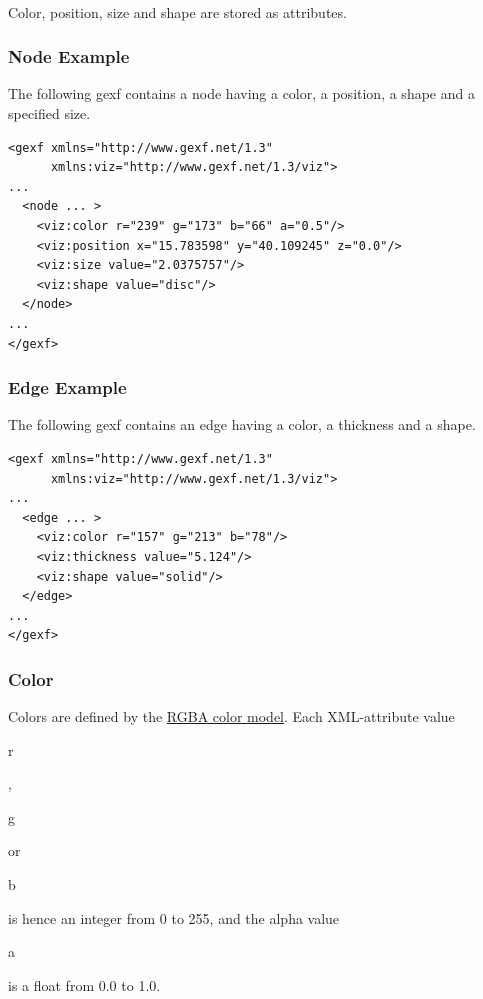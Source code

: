 \documentclass[a4paper,10pt]{article}
\begin{document}
\paragraph{}
Color, position, size and shape are stored as attributes.

\subsubsection{Node Example}

The following gexf contains a node having a color, a position, a shape and a specified size.

\lstset{ style=gexf }
\begin{lstlisting}[caption={VIZ Attributes},label=vizattr]
<gexf xmlns="http://www.gexf.net/1.3"
      xmlns:viz="http://www.gexf.net/1.3/viz">
...
  <node ... >
    <viz:color r="239" g="173" b="66" a="0.5"/>
    <viz:position x="15.783598" y="40.109245" z="0.0"/>
    <viz:size value="2.0375757"/>
    <viz:shape value="disc"/>
  </node>
...
</gexf>
\end{lstlisting}

\subsubsection{Edge Example}

The following gexf contains an edge having a color, a thickness and a shape.

\lstset{ style=gexf }
\begin{lstlisting}[caption={VIZ Attributes},label=vizattr]
<gexf xmlns="http://www.gexf.net/1.3"
      xmlns:viz="http://www.gexf.net/1.3/viz">
...
  <edge ... >
    <viz:color r="157" g="213" b="78"/>
    <viz:thickness value="5.124"/>
    <viz:shape value="solid"/>
  </edge>
...
</gexf>
\end{lstlisting}

\subsubsection{Color}

Colors are defined by the \href{http://en.wikipedia.org/wiki/RGBA}{RGBA color model}. Each XML-attribute value \begin{footnotesize}r\end{footnotesize}, \begin{footnotesize}g\end{footnotesize} or \begin{footnotesize}b\end{footnotesize} is hence an integer from 0 to 255, and the alpha value \begin{footnotesize}a\end{footnotesize} is a float from 0.0 to 1.0.
\end{document}
